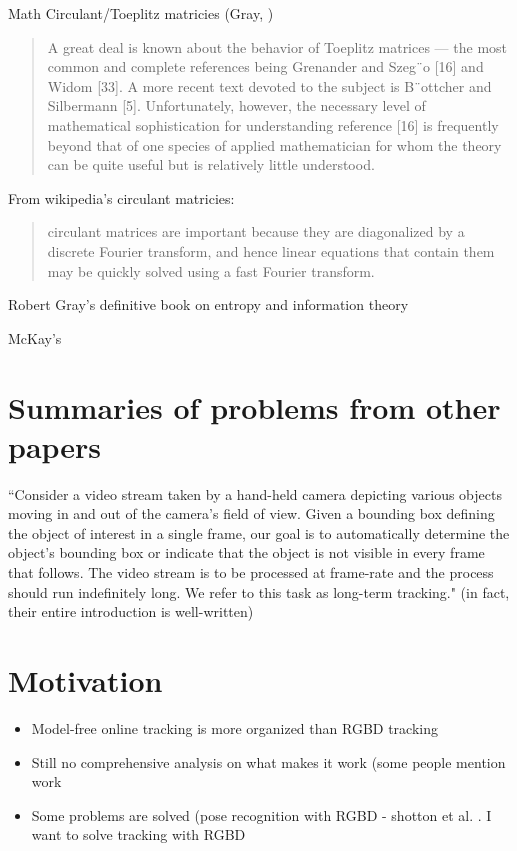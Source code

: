 Math
Circulant/Toeplitz matricies (Gray, \cite{gray2005toeplitz})

\blockquote{A great deal is known about the behavior of Toeplitz matrices
— the most common and complete references being Grenander and
Szeg¨o [16] and Widom [33]. A more recent text devoted to the subject
is B¨ottcher and Silbermann [5]. Unfortunately, however, the necessary
level of mathematical sophistication for understanding reference [16]
is frequently beyond that of one species of applied mathematician for
whom the theory can be quite useful but is relatively little understood.}

From wikipedia's circulant matricies:
\blockquote{circulant matrices are important because they are diagonalized by a discrete Fourier transform, and hence linear equations that contain them may be quickly solved using a fast Fourier transform.}

Robert Gray's definitive book on entropy and information theory \cite{gray2011entropy}

McKay's \cite{mackay2003information}



\section{Summaries of problems from other papers}
``Consider a video stream taken by a hand-held camera depicting various objects moving in and out of the camera’s field of
view. Given a bounding box defining the object of interest
in a single frame, our goal is to automatically determine
the object’s bounding box or indicate that the object is not
visible in every frame that follows. The video stream is to be
processed at frame-rate and the process should run indefinitely
long. We refer to this task as long-term tracking." \cite{kalal2012tracking} (in fact, their entire introduction is well-written)

\section{Motivation}
\begin{itemize}
  \item Model-free online tracking is more organized than RGBD tracking
  \item Still no comprehensive analysis on what makes it work (some people mention work
  \item Some problems are solved (pose recognition with RGBD - shotton et al. \cite{shotton2013real}. I want to solve tracking with RGBD
\end{itemize}



